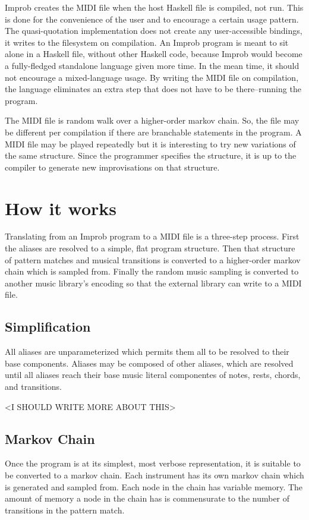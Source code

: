 \documentclass[pldi]{sigplanconf-pldi15}
\begin{document}
Improb creates the MIDI file when the host Haskell file is compiled, not run. This is done for the convenience of the user and to encourage a certain usage pattern. The quasi-quotation implementation does not create any user-accessible bindings, it writes to the filesystem on compilation. An Improb program is meant to sit alone in a Haskell file, without other Haskell code, because Improb would become a fully-fledged standalone language given more time. In the mean time, it should not encourage a mixed-language usage. By writing the MIDI file on compilation, the language eliminates an extra step that does not have to be there--running the program.

The MIDI file is random walk over a higher-order markov chain. So, the file may be different per compilation if there are branchable statements in the program. A MIDI file may be played repeatedly but it is interesting to try new variations of the same structure. Since the programmer specifies the structure, it is up to the compiler to generate new improvisations on that structure.

\section{How it works}
Translating from an Improb program to a MIDI file is a three-step process. First the aliases are resolved to a simple, flat program structure. Then that structure of pattern matches and musical transitions is converted to a higher-order markov chain which is sampled from. Finally the random music sampling is converted to another music library's encoding so that the external library can write to a MIDI file.

\subsection{Simplification}
All aliases are unparameterized which permits them all to be resolved to their base components. Aliases may be composed of other aliases, which are resolved until all aliases reach their base music literal componentes of notes, rests, chords, and transitions.

<I SHOULD WRITE MORE ABOUT THIS>

\subsection{Markov Chain}
Once the program is at its simplest, most verbose representation, it is suitable to be converted to a markov chain. Each instrument has its own markov chain which is generated and sampled from. Each node in the chain has variable memory. The amount of memory a node in the chain has is commensurate to the number of transitions in the pattern match.
\end{document}
